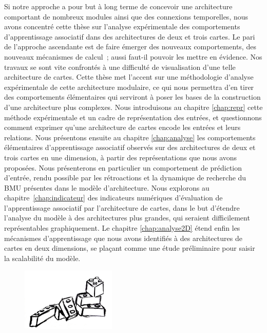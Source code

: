 Si notre approche a pour but à long terme de concevoir une architecture comportant de nombreux modules ainsi que des connexions temporelles, nous avons concentré cette thèse sur l'analyse expérimentale des comportements d'apprentissage associatif dans des architectures de deux et trois cartes.
Le pari de l'approche ascendante est de faire émerger des nouveaux comportements, des nouveaux mécanismes de calcul~; aussi faut-il pouvoir les mettre en évidence. Nos travaux se sont vite confrontés à une difficulté de visualisation d'une telle architecture de cartes. Cette thèse met l'accent sur une méthodologie d'analyse expérimentale de cette architecture modulaire, ce qui nous permettra d'en tirer des comportements élémentaires qui serviront à poser les bases de la construction d'une architecture plus complexes.
Nous introduisons au chapitre \ref{chap:repr} cette méthode expérimentale et un cadre de représentation des entrées, et questionnons comment exprimer qu'une architecture de cartes encode les entrées et leurs relations.
Nous présentons ensuite au chapitre \ref{chap:analyse} les comportements élémentaires d'apprentissage associatif observés sur des architectures de deux et trois cartes en une dimension, à partir des représentations que nous avons proposées. Nous présenterons en particulier un comportement de prédiction d'entrée, rendu possible par les rétroactions et la dynamique de recherche du BMU présentes dans le modèle d'architecture.
Nous explorons au chapitre~\ref{chap:indicateur} des indicateurs numériques d'évaluation de l'apprentissage associatif par l'architecture de cartes, dans le but d'étendre l'analyse du modèle à des architectures plus grandes, qui seraient difficilement représentables graphiquement.
Le chapitre \ref{chap:analyse2D} étend enfin les mécanismes d'apprentissage que nous avons identifiés à des architectures de cartes en deux dimensions, se plaçant comme une étude préliminaire pour saisir la scalabilité du modèle.


    \begin{figure}[b]
        \vspace{1cm}
        \centering\includegraphics[width=0.4\textwidth]{lego2.jpg}
        \vspace{1cm}
    \end{figure}

